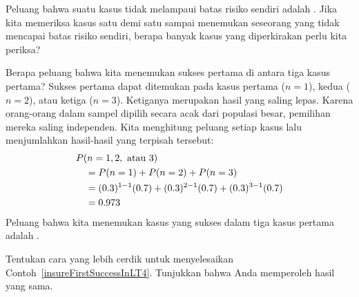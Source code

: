 \begin{exercisewrap}
\begin{nexercise}
Peluang bahwa suatu kasus tidak melampaui batas risiko sendiri adalah
\insureSprob{}. Jika kita memeriksa kasus satu demi satu sampai menemukan
seseorang yang tidak mencapai batas risiko sendiri, berapa banyak kasus
yang diperkirakan perlu kita periksa?\footnotemark{}
\end{nexercise}
\end{exercisewrap}

\begin{examplewrap}
\begin{nexample}{Berapa peluang bahwa kita menemukan sukses pertama
    di antara tiga kasus pertama?}
  \label{insureFirstSuccessInLT4}%
  Sukses pertama dapat ditemukan pada kasus pertama ($n=1$), kedua
  ($n=2$), atau ketiga ($n=3$). Ketiganya merupakan hasil yang saling
  lepas. Karena orang-orang dalam sampel dipilih secara acak dari populasi
  besar, pemilihan mereka saling independen. Kita menghitung peluang
  setiap kasus lalu menjumlahkan hasil-hasil yang terpisah tersebut:
  \begin{align*}
  &P(n=1, 2, \text{ atau }3) \\
    & \quad = P(n=1)+P(n=2)+P(n=3) \\
    & \quad = (0.3{})^{1-1}(0.7{})
        + (0.3{})^{2-1}(0.7{})
        + (0.3{})^{3-1}(0.7{}) \\
    & \quad = 0.973{}
  \end{align*}
  Peluang bahwa kita menemukan kasus yang sukses dalam tiga kasus pertama
  adalah \insureCDistC{}.
\end{nexample}
\end{examplewrap}

\begin{exercisewrap}
\begin{nexercise}
Tentukan cara yang lebih cerdik untuk menyelesaikan
Contoh~\ref{insureFirstSuccessInLT4}. Tunjukkan bahwa Anda memperoleh hasil
yang sama.\footnotemark{}
\end{nexercise}
\end{exercisewrap}


